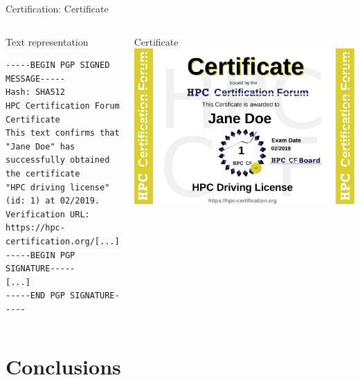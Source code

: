 \documentclass[compress,aspectratio=169]{beamer}
\begin{document}
\begin{frame}[fragile]{Certification: Certificate}
\begin{columns}
	\begin{block}{Text representation}

		\scriptsize
		\begin{verbatim}
-----BEGIN PGP SIGNED MESSAGE-----
Hash: SHA512
HPC Certification Forum Certificate
This text confirms that "Jane Doe" has
successfully obtained the certificate
"HPC driving license" (id: 1) at 02/2019.
Verification URL: https://hpc-certification.org/[...]
-----BEGIN PGP SIGNATURE-----
[...]
-----END PGP SIGNATURE-----
		\end{verbatim}
	\end{block}

	\begin{block}{Certificate}
		\medskip
		\includegraphics[width=\textwidth]{jane-doe}
	\end{block}
\end{columns}
\end{frame}


\section{Conclusions}
\sectionIntroHidden
\end{document}
